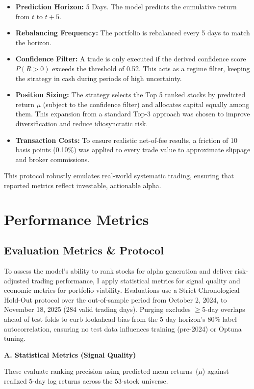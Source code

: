 \documentclass[twoside,final]{hcmut-report}
\begin{document}
\begin{itemize}
  \item \textbf{Prediction Horizon:} 5 Days. The model predicts the cumulative return from $t$ to $t+5$.
  \item \textbf{Rebalancing Frequency:} The portfolio is rebalanced every 5 days to match the horizon.
  \item \textbf{Confidence Filter:} A trade is only executed if the derived confidence score $P(R>0)$ exceeds the threshold of 0.52. This acts as a regime filter, keeping the strategy in cash during periods of high uncertainty.
  \item \textbf{Position Sizing:} The strategy selects the Top 5 ranked stocks by predicted return $\mu$ (subject to the confidence filter) and allocates capital equally among them. This expansion from a standard Top-3 approach was chosen to improve diversification and reduce idiosyncratic risk.
  \item \textbf{Transaction Costs:} To ensure realistic net-of-fee results, a friction of 10 basis points (0.10\%) was applied to every trade value to approximate slippage and broker commissions.
\end{itemize}

\noindent
This protocol robustly emulates real-world systematic trading, ensuring that reported metrics reflect investable, actionable alpha.

\section{Performance Metrics}
\subsection{Evaluation Metrics \& Protocol}
To assess the model's ability to rank stocks for alpha generation and deliver risk-adjusted trading performance, I apply statistical metrics for signal quality and economic metrics for portfolio viability. Evaluations use a Strict Chronological Hold-Out protocol over the out-of-sample period from October 2, 2024, to November 18, 2025 (284 valid trading days). Purging excludes $\geq$5-day overlaps ahead of test folds to curb lookahead bias from the 5-day horizon's 80\% label autocorrelation, ensuring no test data influences training (pre-2024) or Optuna tuning.

\textbf{A. Statistical Metrics (Signal Quality)}

These evaluate ranking precision using predicted mean returns~($\mu$) against realized 5-day log returns across the 53-stock universe.
\end{document}
